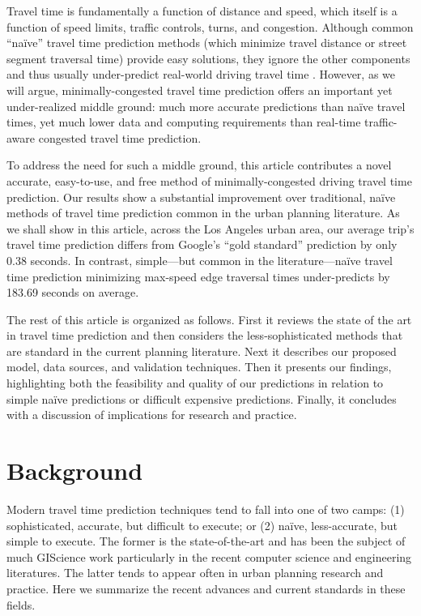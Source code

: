 \documentclass[12pt,letterpaper]{article} %
\begin{document}
Travel time is fundamentally a function of distance and speed, which itself is a function of speed limits, traffic controls, turns, and congestion. Although common \enquote{naïve} travel time prediction methods (which minimize travel distance or street segment traversal time) provide easy solutions, they ignore the other components and thus usually under-predict real-world driving travel time \citep{ludwig2023traffic,salonen2013modelling,yiannakoulias2013estimating}. However, as we will argue, minimally-congested travel time prediction offers an important yet under-realized middle ground: much more accurate predictions than naïve travel times, yet much lower data and computing requirements than real-time traffic-aware congested travel time prediction.

To address the need for such a middle ground, this article contributes a novel accurate, easy-to-use, and free method of minimally-congested driving travel time prediction. Our results show a substantial improvement over traditional, naïve methods of travel time prediction common in the urban planning literature. As we shall show in this article, across the Los Angeles urban area, our average trip's travel time prediction differs from Google's \enquote{gold standard} prediction by only 0.38 seconds. In contrast, simple---but common in the literature---naïve travel time prediction minimizing max-speed edge traversal times under-predicts by 183.69 seconds on average.

The rest of this article is organized as follows. First it reviews the state of the art in travel time prediction and then considers the less-sophisticated methods that are standard in the current planning literature. Next it describes our proposed model, data sources, and validation techniques. Then it presents our findings, highlighting both the feasibility and quality of our predictions in relation to simple naïve predictions or difficult expensive predictions. Finally, it concludes with a discussion of implications for research and practice.

\section{Background}

Modern travel time prediction techniques tend to fall into one of two camps: (1) sophisticated, accurate, but difficult to execute; or (2) naïve, less-accurate, but simple to execute. The former is the state-of-the-art and has been the subject of much GIScience work particularly in the recent computer science and engineering literatures. The latter tends to appear often in urban planning research and practice. Here we summarize the recent advances and current standards in these fields.
\end{document}

